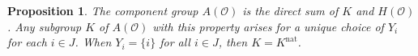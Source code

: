 \documentclass{amsart}
\newtheorem{proposition}[theorem]{Proposition}
\theoremstyle{definition}
\DeclareMathOperator{\nat}{nat}
\newcommand{\0}{\mathcal{O}}
\begin{document}
\begin{proposition}
The component group $A(\0)$ is the direct sum of $K$ and $H(\0)$.
Any subgroup $K$ of $A(\0)$ with this property arises for a unique choice of $Y_i$ for each $i \in J$.
When $Y_i = \{i\}$ for all $i \in J$, then $K=K^{\nat}$.
\end{proposition}




\end{document}
